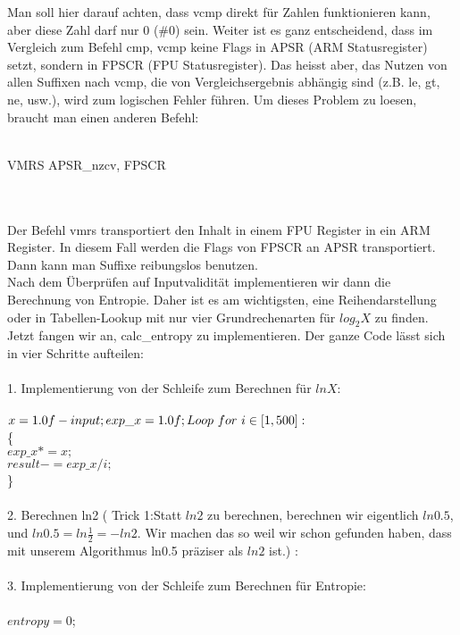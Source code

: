 \documentclass[11pt]{article}
\begin{document}
{{{Man soll hier darauf achten, dass vcmp direkt f\"ur Zahlen funktionieren kann, aber diese Zahl darf nur 0 (\#0) sein. Weiter ist es ganz entscheidend, dass im Vergleich zum Befehl cmp, vcmp keine Flags in APSR (ARM Statusregister) setzt, sondern in FPSCR (FPU Statusregister). Das heisst aber, das Nutzen von allen Suffixen nach vcmp, die von Vergleichsergebnis abh\"angig sind (z.B. le, gt, ne, usw.), wird zum logischen Fehler f\"uhren. Um dieses Problem zu loesen, braucht man einen anderen Befehl: \\\\
\centerline{VMRS APSR\_nzcv, FPSCR} \\\\
Der Befehl vmrs transportiert den Inhalt in einem FPU Register in ein ARM Register. In diesem Fall werden die Flags von FPSCR an APSR transportiert. Dann kann man Suffixe reibungslos benutzen.\\
Nach dem \"Uberpr\"ufen auf Inputvalidit\"at implementieren wir dann die Berechnung von Entropie. Daher ist es am wichtigsten, eine Reihendarstellung oder in Tabellen-Lookup mit nur vier Grundrechenarten f\"ur $log_2{X}$ zu finden.\\
Jetzt fangen wir an, calc\_entropy zu implementieren. Der ganze Code l\"asst sich in vier Schritte aufteilen:\\\\
{\Large 1.}	Implementierung von der Schleife zum Berechnen f\"ur $ln{X}$:\\ \\
{ \color{blue} $x = 1.0f - input; \\
exp\_x = 1.0f; \\
Loop \ for\ i \in [1, 500]: $\\
\{ \\ 
        $exp\_x *= x; $\\
        $result -= exp\_x / i; $\\
\} } \\\\
{\Large 2.} Berechnen ln2 ( {\color{red} Trick 1:Statt $ln{2}$ zu berechnen, berechnen wir eigentlich $ln{0.5}$, und $ln{0.5} = ln{\frac{1}{2}} = -ln{2}$. Wir machen das so weil wir schon gefunden haben, dass mit unserem Algorithmus ln0.5 pr\"aziser als $ln{2}$ ist.}) : \\\\
{\Large 3.} Implementierung von der Schleife zum Berechnen f\"ur Entropie:\\\\
{\color{blue} $entropy = 0$;\\
}}}}
\end{document}
